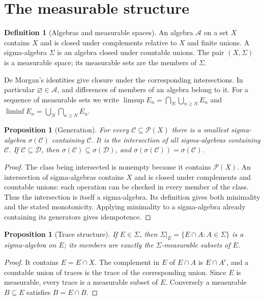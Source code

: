 \documentclass[11pt,oneside,openany]{book}
\newtheorem{proposition}[theorem]{Proposition}
\theoremstyle{definition}
\newtheorem{definition}[theorem]{Definition}
\theoremstyle{remark}
\newcommand{\calA}{\mathcal A}\newcommand{\LL}{\mathcal L}
\newcommand{\family}[1]{}
\begin{document}
\section{The measurable structure}

\begin{definition}[Algebras and measurable spaces]
\family{D11.01.measurable_space}\label{d11:01:measurable-space}
An algebra $\calA$ on a set $X$ contains $X$ and is closed under complements
relative to $X$ and finite unions. A sigma-algebra $\Sigma$ is an algebra
closed under countable unions. The pair $(X,\Sigma)$ is a measurable space;
its measurable sets are the members of $\Sigma$.
\end{definition}

De Morgan's identities give closure under the corresponding intersections.
In particular $\varnothing\in\calA$, and differences of members of an
algebra belong to it. For a sequence of measurable sets we write
$\limsup E_n=\bigcap_N\bigcup_{n\geq N}E_n$ and
$\liminf E_n=\bigcup_N\bigcap_{n\geq N}E_n$.

\begin{proposition}[Generation]
\family{D11.01.generated_sigma}\label{d11:01:generated-sigma}
For every $\mathcal C\subseteq\mathcal P(X)$ there is a smallest sigma-algebra
$\sigma(\mathcal C)$ containing $\mathcal C$. It is the intersection of all
sigma-algebras containing $\mathcal C$. If $\mathcal C\subseteq\mathcal D$,
then $\sigma(\mathcal C)\subseteq\sigma(\mathcal D)$, and
$\sigma(\sigma(\mathcal C))=\sigma(\mathcal C)$.
\end{proposition}
\begin{proof}
The class being intersected is nonempty because it contains $\mathcal P(X)$.
An intersection of sigma-algebras contains $X$ and is closed under complements
and countable unions: each operation can be checked in every member of the
class. Thus the intersection is itself a sigma-algebra. Its definition gives
both minimality and the stated monotonicity. Applying minimality to a
sigma-algebra already containing its generators gives idempotence.
\end{proof}

\begin{proposition}[Trace structure]
\family{D11.01.trace_sigma}\label{d11:01:trace-sigma}
If $E\in\Sigma$, then
$\Sigma|_E=\{E\cap A:A\in\Sigma\}$ is a sigma-algebra on $E$; its members
are exactly the $\Sigma$-measurable subsets of $E$.
\end{proposition}
\begin{proof}
It contains $E=E\cap X$. The complement in $E$ of $E\cap A$ is
$E\cap A^c$, and a countable union of traces is the trace of the corresponding
union. Since $E$ is measurable, every trace is a measurable subset of $E$.
Conversely a measurable $B\subseteq E$ satisfies $B=E\cap B$.
\end{proof}
\end{document}
